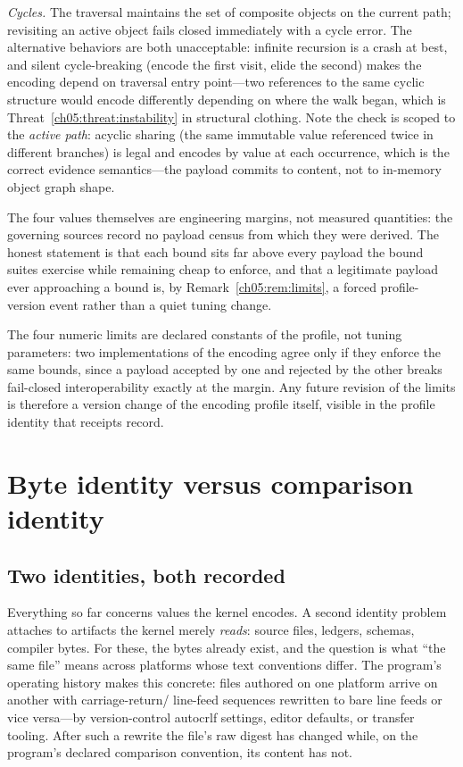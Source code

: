 \emph{Cycles.} The traversal maintains the set of composite objects on the
current path; revisiting an active object fails closed immediately with a
cycle error. The alternative behaviors are both unacceptable: infinite
recursion is a crash at best, and silent cycle-breaking (encode the first
visit, elide the second) makes the encoding depend on traversal entry
point---two references to the same cyclic structure would encode
differently depending on where the walk began, which is
Threat~\ref{ch05:threat:instability} in structural clothing. Note the check
is scoped to the \emph{active path}: acyclic sharing (the same immutable
value referenced twice in different branches) is legal and encodes by
value at each occurrence, which is the correct evidence semantics---the
payload commits to content, not to in-memory object graph shape.

The four values themselves are engineering margins, not measured
quantities: the governing sources record no payload census from which
they were derived. The honest statement is that each bound sits far
above every payload the bound suites exercise while remaining cheap to
enforce, and that a legitimate payload ever approaching a bound is, by
Remark~\ref{ch05:rem:limits}, a forced profile-version event rather
than a quiet tuning change.

\begin{remark}\label{ch05:rem:limits}
The four numeric limits are declared constants of the profile, not tuning
parameters: two implementations of the encoding agree only if they enforce
the same bounds, since a payload accepted by one and rejected by the other
breaks fail-closed interoperability exactly at the margin. Any future
revision of the limits is therefore a version change of the encoding
profile itself, visible in the profile identity that receipts record.
\end{remark}

\section{Byte identity versus comparison identity}\label{ch05:byteid}

\subsection{Two identities, both recorded}

Everything so far concerns values the kernel encodes. A second identity
problem attaches to artifacts the kernel merely \emph{reads}: source files,
ledgers, schemas, compiler bytes. For these, the bytes already exist, and
the question is what ``the same file'' means across platforms whose text
conventions differ. The program's operating history makes this concrete:
files authored on one platform arrive on another with carriage-return/
line-feed sequences rewritten to bare line feeds or vice versa---by
version-control autocrlf settings, editor defaults, or transfer tooling.
After such a rewrite the file's raw digest has changed while, on the
program's declared comparison convention, its content has not.

